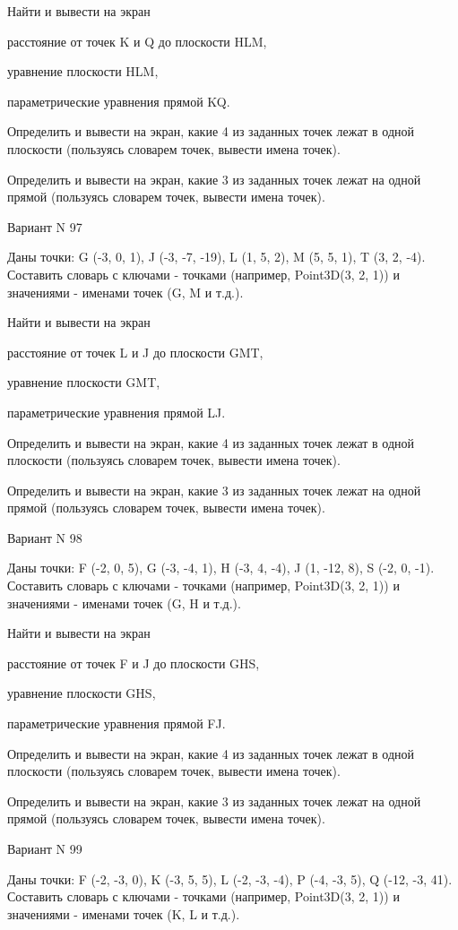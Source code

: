 \documentclass[11pt]{report}
\begin{document}
 
Найти и вывести на экран


расстояние от точек K и Q до плоскости HLM,

 
уравнение плоскости HLM,

 
параметрические уравнения прямой KQ.


Определить и вывести на экран, какие 4 из заданных точек лежат в одной плоскости (пользуясь словарем точек, вывести имена точек).


Определить и вывести на экран, какие 3 из заданных точек лежат на одной прямой (пользуясь словарем точек, вывести имена точек).

Вариант N 97

Даны точки: G (-3, 0, 1), J (-3, -7, -19), L (1, 5, 2), M (5, 5, 1), T (3, 2, -4).
Составить словарь с ключами - точками (например, Point3D(3, 2, 1)) и значениями - именами точек (G, M и т.д.).

 
Найти и вывести на экран


расстояние от точек L и J до плоскости GMT,

 
уравнение плоскости GMT,

 
параметрические уравнения прямой LJ.


Определить и вывести на экран, какие 4 из заданных точек лежат в одной плоскости (пользуясь словарем точек, вывести имена точек).


Определить и вывести на экран, какие 3 из заданных точек лежат на одной прямой (пользуясь словарем точек, вывести имена точек).

Вариант N 98

Даны точки: F (-2, 0, 5), G (-3, -4, 1), H (-3, 4, -4), J (1, -12, 8), S (-2, 0, -1).
Составить словарь с ключами - точками (например, Point3D(3, 2, 1)) и значениями - именами точек (G, H и т.д.).

 
Найти и вывести на экран


расстояние от точек F и J до плоскости GHS,

 
уравнение плоскости GHS,

 
параметрические уравнения прямой FJ.


Определить и вывести на экран, какие 4 из заданных точек лежат в одной плоскости (пользуясь словарем точек, вывести имена точек).


Определить и вывести на экран, какие 3 из заданных точек лежат на одной прямой (пользуясь словарем точек, вывести имена точек).

Вариант N 99

Даны точки: F (-2, -3, 0), K (-3, 5, 5), L (-2, -3, -4), P (-4, -3, 5), Q (-12, -3, 41).
Составить словарь с ключами - точками (например, Point3D(3, 2, 1)) и значениями - именами точек (K, L и т.д.).
\end{document}
